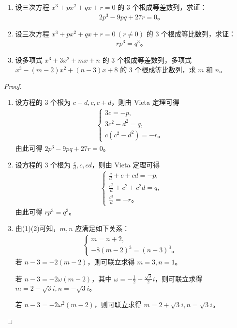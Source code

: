\documentclass[../../main.tex]{subfiles}
\begin{document}
\begin{example}
\begin{enumerate}[(1)]
\item 设三次方程 $x^3 + px^2 + qx + r = 0$ 的 3 个根成等差数列，求证：
\begin{align*}
2p^3 - 9pq + 27r = 0。
\end{align*}

\item 设三次方程 $x^3 + px^2 + qx + r = 0 \ (r \neq 0)$ 的 3 个根成等比数列，求证：
\begin{align*}
rp^3 = q^3。
\end{align*}

\item 设多项式 $x^3 + 3x^2 + mx + n$ 的 3 个根成等差数列，多项式 $x^3 - (m - 2)x^2 + (n - 3)x + 8$ 的 3 个根成等比数列，求 $m$ 和 $n$。
\end{enumerate}
\end{example}
\begin{proof}
\begin{enumerate}[(1)]
\item 设方程的 3 个根为 $c - d, c, c + d$，则由 Vieta 定理可得
\begin{align*}
\begin{cases}
3c = -p, \\
3c^2 - d^2 = q, \\
c(c^2 - d^2) = -r。
\end{cases}
\end{align*}
由此可得 $2p^3 - 9pq + 27r = 0。$

\item 设方程的 3 个根为 $\frac{c}{d}, c, cd$，则由 Vieta 定理可得
\begin{align*}
\begin{cases}
\frac{c}{d} + c + cd = -p, \\
\frac{c^2}{d} + c^2 + c^2 d = q, \\
\frac{c^3}{d} = -r。
\end{cases}
\end{align*}
由此可得 $rp^3 = q^3。$

\item 由(1)(2)可知，$m, n$ 应满足如下关系：
\begin{align*}
\begin{cases}
m = n + 2, \\
-8(m - 2)^3 = (n - 3)^3。
\end{cases}
\end{align*}
若 $n - 3 = -2(m - 2)$，则可联立求得 $m = 3, n = 1$。

若 $n - 3 = -2\omega(m - 2)$，其中 $\omega = -\frac{1}{2} + \frac{\sqrt{3}}{2}i$，则可联立求得 $m = 2 - \sqrt{3}i, n = -\sqrt{3}i$。

若 $n - 3 = -2\omega^2(m - 2)$，则可联立求得 $m = 2 + \sqrt{3}i, n = \sqrt{3}i。$
\end{enumerate}
\end{proof}
\end{document}
